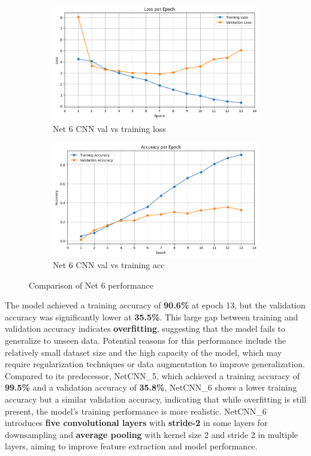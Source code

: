 \documentclass[12pt]{article}
\begin{document}
\begin{figure}[ht]
    \centering
    \begin{subfigure}{0.45\linewidth}
        \centering
        \includegraphics[width=\linewidth]{net6_loss.png}
        \caption{Net 6 CNN val vs training loss}
        \label{fig:net6_loss}
    \end{subfigure}
    \hfill
    \begin{subfigure}{0.45\linewidth}
        \centering
        \includegraphics[width=\linewidth]{net6_acc.png}
        \caption{Net 6 CNN val vs training acc}
        \label{fig:net6_acc}
    \end{subfigure}
    \caption{Comparison of Net 6 performance}
    \label{fig:net6_performance}
\end{figure}

The model achieved a training accuracy of \textbf{90.6\%} at epoch 13, but the validation accuracy was significantly lower at \textbf{35.5\%}. This large gap between training and validation accuracy indicates \textbf{overfitting}, suggesting that the model fails to generalize to unseen data. Potential reasons for this performance include the relatively small dataset size and the high capacity of the model, which may require regularization techniques or data augmentation to improve generalization. Compared to its predecessor, NetCNN\_5, which achieved a training accuracy of \textbf{99.5\%} and a validation accuracy of \textbf{35.8\%}, NetCNN\_6 shows a lower training accuracy but a similar validation accuracy, indicating that while overfitting is still present, the model's training performance is more realistic. NetCNN\_6 introduces \textbf{five convolutional layers} with \textbf{stride-2} in some layers for downsampling and \textbf{average pooling} with kernel size 2 and stride 2 in multiple layers, aiming to improve feature extraction and model performance.
\end{document}
